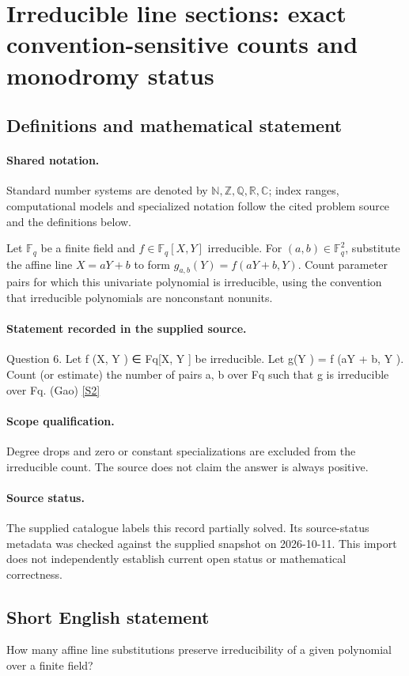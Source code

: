 \documentclass[11pt]{article}
\newcommand{\sref}[2]{\hyperlink{source:#1:#2}{[S#2]}}
\begin{document}
\section{Irreducible line sections: exact convention-sensitive counts and monodromy status}\label{statement}

\subsection{Definitions and mathematical statement}

\paragraph{Shared notation.}Standard number systems are denoted by $\mathbb N,\mathbb Z,\mathbb Q,\mathbb R,\mathbb C$; index ranges, computational models and specialized notation follow the cited problem source and the definitions below.


Let $\mathbb F_q$ be a finite field and $f\in\mathbb F_q[X,Y]$ irreducible. For $(a,b)\in\mathbb F_q^2$, substitute the affine line $X=aY+b$ to form $g_{a,b}(Y)=f(aY+b,Y)$. Count parameter pairs for which this univariate polynomial is irreducible, using the convention that irreducible polynomials are nonconstant nonunits.
\paragraph{Statement recorded in the supplied source.}
Question 6. Let f (X, Y ) ∈ Fq[X, Y ] be irreducible. Let g(Y ) = f (aY + b, Y ). Count (or estimate) the number of pairs a, b over Fq such that g is irreducible over Fq. (Gao) \sref{statement}{2}
\paragraph{Scope qualification.}
Degree drops and zero or constant specializations are excluded from the irreducible count. The source does not claim the answer is always positive.
\paragraph{Source status.}
The supplied catalogue labels this record partially solved. Its source-status metadata was checked against the supplied snapshot on 2026-10-11. This import does not independently establish current open status or mathematical correctness.
\subsection{Short English statement}
How many affine line substitutions preserve irreducibility of a given polynomial over a finite field?
\end{document}
